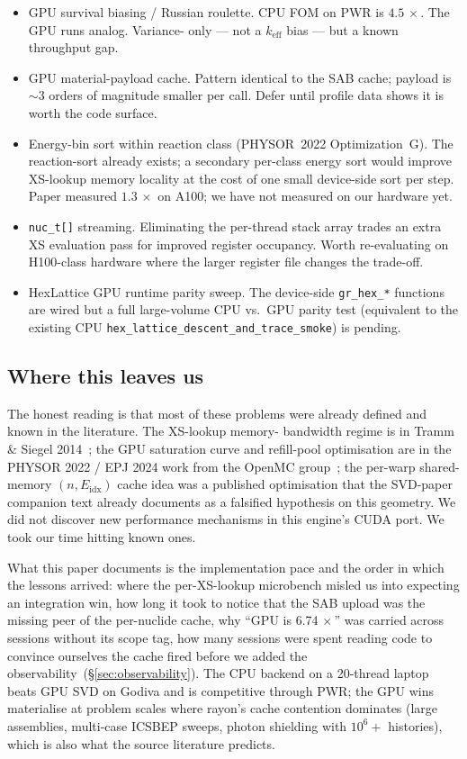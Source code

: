 \begin{itemize}
    \item GPU survival biasing / Russian roulette. CPU FOM
        on PWR is $4.5\,\times$. The GPU runs analog. Variance-
        only --- not a $k_\text{eff}$ bias --- but a known
        throughput gap.
    \item GPU material-payload cache. Pattern identical to the
        SAB cache; payload is $\sim$3 orders of magnitude
        smaller per call. Defer until profile data shows it is
        worth the code surface.
    \item Energy-bin sort within reaction class (PHYSOR~2022
        Optimization~G). The reaction-sort already exists; a
        secondary per-class energy sort would improve XS-lookup
        memory locality at the cost of one small device-side sort
        per step. Paper measured $1.3\,\times$ on A100; we have
        not measured on our hardware yet.
    \item \texttt{nuc\_t[]} streaming. Eliminating the per-thread
        stack array trades an extra XS evaluation pass for
        improved register occupancy. Worth re-evaluating on
        H100-class hardware where the larger register file
        changes the trade-off.
    \item HexLattice GPU runtime parity sweep. The device-side
        \texttt{gr\_hex\_*} functions are wired but a full
        large-volume CPU vs.\ GPU parity test (equivalent to the
        existing CPU \texttt{hex\_lattice\_descent\_and\_trace\_smoke})
        is pending.
\end{itemize}

\subsection{Where this leaves us}

The honest reading is that most of these problems were already
defined and known in the literature. The XS-lookup memory-
bandwidth regime is in Tramm \& Siegel
2014~\cite{tramm2014xsbench}; the GPU saturation curve and
refill-pool optimisation are in the PHYSOR 2022 / EPJ 2024 work
from the OpenMC group~\cite{tramm2024}; the per-warp shared-memory
$(n, E_\text{idx})$ cache idea was a published optimisation that
the SVD-paper companion text already documents as a falsified
hypothesis on this geometry. We did not discover new performance
mechanisms in this engine's CUDA port. We took our time hitting
known ones.

What this paper documents is the implementation pace and the
order in which the lessons arrived: where the per-XS-lookup
microbench misled us into expecting an integration win, how long
it took to notice that the SAB upload was the missing peer of
the per-nuclide cache, why ``GPU is 6.74$\,\times$'' was carried
across sessions without its scope tag, how many sessions were
spent reading code to convince ourselves the cache fired before
we added the observability~(§\ref{sec:observability}). The CPU
backend on a 20-thread laptop beats GPU SVD on Godiva and is
competitive through PWR; the GPU wins materialise at problem
scales where rayon's cache contention dominates (large
assemblies, multi-case ICSBEP sweeps, photon shielding with
$10^6+$ histories), which is also what the source literature
predicts.
